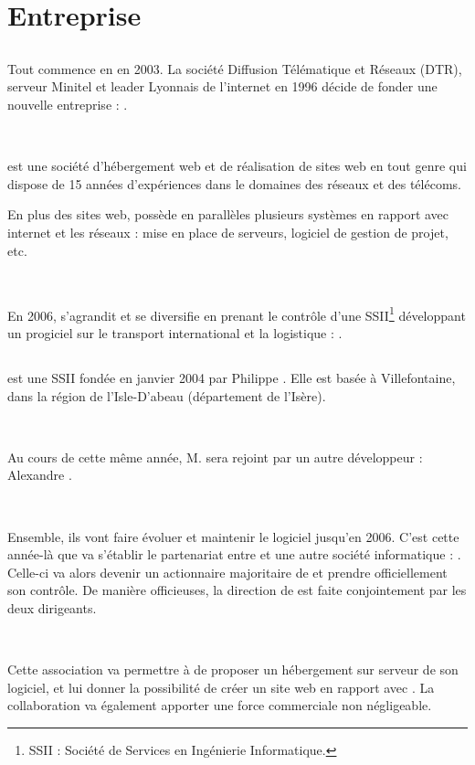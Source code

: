 \chapter{Entreprise}
\section{\fidit}
Tout commence en en 2003. La société Diffusion Télématique et Réseaux (DTR), serveur Minitel et leader Lyonnais de l'internet en 1996 décide de fonder une nouvelle entreprise : \fidit{}.

~

\fidit{} est une société d'hébergement web et de réalisation de sites web en tout genre qui dispose de 15 années d'expériences dans le domaines des réseaux et des télécoms.

En plus des sites web, \fidit{} possède en parallèles plusieurs systèmes en rapport avec internet et les réseaux : mise en place de serveurs, logiciel de gestion de projet, etc.

~

En 2006, \fidit{} s'agrandit et se diversifie en prenant le contrôle d'une SSII\footnote{SSII : Société de Services en Ingénierie Informatique.} développant un progiciel sur le transport international et la logistique : \solulog.

\section{\solulog}
\solulog{} est une SSII fondée en janvier 2004 par Philippe . Elle est basée à Villefontaine, dans la région de l'Isle-D'abeau (département de l'Isère).

~

Au cours de cette même année, M.  sera rejoint par un autre développeur : Alexandre .

~

Ensemble, ils vont faire évoluer et maintenir le logiciel \integrale{} jusqu'en 2006. C'est cette année-là que va s'établir le partenariat entre \solulog{} et une autre société informatique : \fidit. Celle-ci va alors devenir un actionnaire majoritaire de \solulog{} et prendre officiellement son contrôle. De manière officieuses, la direction de \solulog{} est faite conjointement par les deux dirigeants.

~

Cette association va permettre à \solulog{} de proposer un hébergement sur serveur de son logiciel, et lui donner la possibilité de créer un site web en rapport avec \integrale. La collaboration va également apporter une force commerciale non négligeable.

